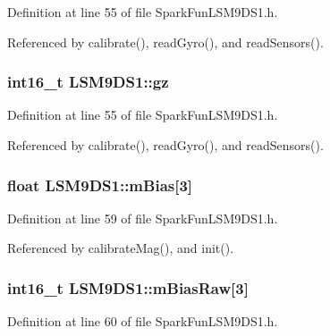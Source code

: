 Definition at line 55 of file Spark\+Fun\+L\+S\+M9\+D\+S1.\+h.



Referenced by calibrate(), read\+Gyro(), and read\+Sensors().

\subsubsection[{\texorpdfstring{gz}{gz}}]{\setlength{\rightskip}{0pt plus 5cm}int16\+\_\+t L\+S\+M9\+D\+S1\+::gz}\hypertarget{class_l_s_m9_d_s1_ad4d0f0585398ff917afcba1b4a73e519}{}\label{class_l_s_m9_d_s1_ad4d0f0585398ff917afcba1b4a73e519}


Definition at line 55 of file Spark\+Fun\+L\+S\+M9\+D\+S1.\+h.



Referenced by calibrate(), read\+Gyro(), and read\+Sensors().

\subsubsection[{\texorpdfstring{m\+Bias}{mBias}}]{\setlength{\rightskip}{0pt plus 5cm}float L\+S\+M9\+D\+S1\+::m\+Bias\mbox{[}3\mbox{]}}\hypertarget{class_l_s_m9_d_s1_aab3753b958a1eaabfb48ffaf837dfadc}{}\label{class_l_s_m9_d_s1_aab3753b958a1eaabfb48ffaf837dfadc}


Definition at line 59 of file Spark\+Fun\+L\+S\+M9\+D\+S1.\+h.



Referenced by calibrate\+Mag(), and init().

\subsubsection[{\texorpdfstring{m\+Bias\+Raw}{mBiasRaw}}]{\setlength{\rightskip}{0pt plus 5cm}int16\+\_\+t L\+S\+M9\+D\+S1\+::m\+Bias\+Raw\mbox{[}3\mbox{]}}\hypertarget{class_l_s_m9_d_s1_ad0e3ab0b7eeee5378ab91dd20270a9b5}{}\label{class_l_s_m9_d_s1_ad0e3ab0b7eeee5378ab91dd20270a9b5}


Definition at line 60 of file Spark\+Fun\+L\+S\+M9\+D\+S1.\+h.



